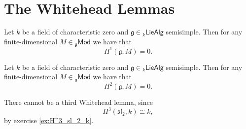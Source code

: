 \section*{The Whitehead Lemmas}

\begin{theorem}
	\label{thm:Wfl}
	Let $k$ be a field of characteristic zero and $\mathfrak{g} \in {_{k}}\mathsf{LieAlg}$ semisimple. Then for any finite-dimensional $M \in {_{\mathfrak{g}}}\mathsf{Mod}$ we have that
	\begin{equation*}
		H^1(\mathfrak{g},M) = 0.
	\end{equation*}
\end{theorem}

\begin{theorem}
	\label{thm:Wfl}
	Let $k$ be a field of characteristic zero and $\mathfrak{g} \in {_{k}}\mathsf{LieAlg}$ semisimple. Then for any finite-dimensional $M \in {_{\mathfrak{g}}}\mathsf{Mod}$ we have that
	\begin{equation*}
		H^2(\mathfrak{g},M) = 0.
	\end{equation*}
\end{theorem}

\begin{remark}
	There cannot be a third Whitehead lemma, since
	\begin{equation*}
		H^3(\mathfrak{sl}_2,k) \cong k,
	\end{equation*}
	\noindent by exercise \ref{ex:H^3_sl_2_k}.
\end{remark}

\printbibliography

